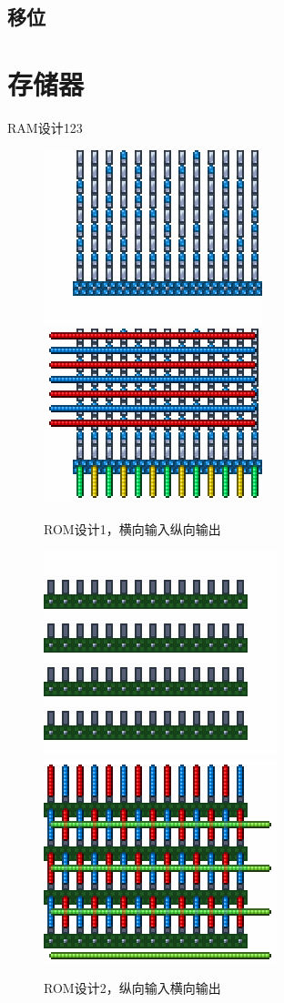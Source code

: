 \subsection{移位}

\section{存储器}
RAM设计123
\begin{figure}
    \centering
    \includegraphics{images/342.png}
    \qquad
    \includegraphics{images/341.png}
    \caption{ROM设计1，横向输入纵向输出}
\end{figure}
\begin{figure}
    \centering
    \includegraphics{images/343.png}
    \qquad
    \includegraphics{images/344.png}
    \caption{ROM设计2，纵向输入横向输出}
\end{figure}

